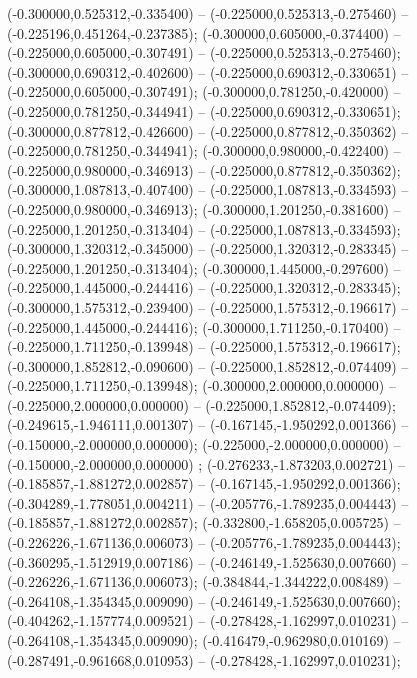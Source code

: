  (-0.300000,0.525312,-0.335400) -- (-0.225000,0.525313,-0.275460) -- (-0.225196,0.451264,-0.237385);
 (-0.300000,0.605000,-0.374400) -- (-0.225000,0.605000,-0.307491) -- (-0.225000,0.525313,-0.275460);
 (-0.300000,0.690312,-0.402600) -- (-0.225000,0.690312,-0.330651) -- (-0.225000,0.605000,-0.307491);
 (-0.300000,0.781250,-0.420000) -- (-0.225000,0.781250,-0.344941) -- (-0.225000,0.690312,-0.330651);
 (-0.300000,0.877812,-0.426600) -- (-0.225000,0.877812,-0.350362) -- (-0.225000,0.781250,-0.344941);
 (-0.300000,0.980000,-0.422400) -- (-0.225000,0.980000,-0.346913) -- (-0.225000,0.877812,-0.350362);
 (-0.300000,1.087813,-0.407400) -- (-0.225000,1.087813,-0.334593) -- (-0.225000,0.980000,-0.346913);
 (-0.300000,1.201250,-0.381600) -- (-0.225000,1.201250,-0.313404) -- (-0.225000,1.087813,-0.334593);
 (-0.300000,1.320312,-0.345000) -- (-0.225000,1.320312,-0.283345) -- (-0.225000,1.201250,-0.313404);
 (-0.300000,1.445000,-0.297600) -- (-0.225000,1.445000,-0.244416) -- (-0.225000,1.320312,-0.283345);
 (-0.300000,1.575312,-0.239400) -- (-0.225000,1.575312,-0.196617) -- (-0.225000,1.445000,-0.244416);
 (-0.300000,1.711250,-0.170400) -- (-0.225000,1.711250,-0.139948) -- (-0.225000,1.575312,-0.196617);
 (-0.300000,1.852812,-0.090600) -- (-0.225000,1.852812,-0.074409) -- (-0.225000,1.711250,-0.139948);
 (-0.300000,2.000000,0.000000) -- (-0.225000,2.000000,0.000000) -- (-0.225000,1.852812,-0.074409);
 (-0.249615,-1.946111,0.001307) -- (-0.167145,-1.950292,0.001366) -- (-0.150000,-2.000000,0.000000);
 (-0.225000,-2.000000,0.000000) -- (-0.150000,-2.000000,0.000000) ;
 (-0.276233,-1.873203,0.002721) -- (-0.185857,-1.881272,0.002857) -- (-0.167145,-1.950292,0.001366);
 (-0.304289,-1.778051,0.004211) -- (-0.205776,-1.789235,0.004443) -- (-0.185857,-1.881272,0.002857);
 (-0.332800,-1.658205,0.005725) -- (-0.226226,-1.671136,0.006073) -- (-0.205776,-1.789235,0.004443);
 (-0.360295,-1.512919,0.007186) -- (-0.246149,-1.525630,0.007660) -- (-0.226226,-1.671136,0.006073);
 (-0.384844,-1.344222,0.008489) -- (-0.264108,-1.354345,0.009090) -- (-0.246149,-1.525630,0.007660);
 (-0.404262,-1.157774,0.009521) -- (-0.278428,-1.162997,0.010231) -- (-0.264108,-1.354345,0.009090);
 (-0.416479,-0.962980,0.010169) -- (-0.287491,-0.961668,0.010953) -- (-0.278428,-1.162997,0.010231);
